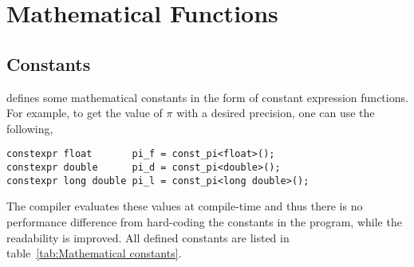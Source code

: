 %
%
%
%

\chapter{Mathematical Functions}
\label{chap:Mathemtical Functions}

\section{Constants}
\label{sec:Constants}

\mckl defines some mathematical constants in the form of constant expression
functions. For example, to get the value of $\pi$ with a desired precision, one
can use the following,
\begin{verbatim}
constexpr float       pi_f = const_pi<float>();
constexpr double      pi_d = const_pi<double>();
constexpr long double pi_l = const_pi<long double>();
\end{verbatim}
The compiler evaluates these values at compile-time and thus there is no
performance difference from hard-coding the constants in the program, while the
readability is improved. All defined constants are listed in
table~\ref{tab:Mathematical constants}.


